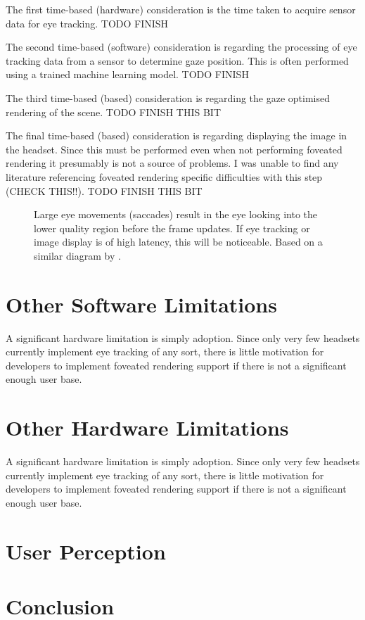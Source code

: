 \documentclass[a4paper,11pt]{article}
\begin{document}
The first time-based (hardware) consideration is the time taken to acquire sensor data for eye tracking. TODO FINISH

The second time-based (software) consideration is regarding the processing of eye tracking data from a sensor to determine gaze position. This is often performed using a trained machine learning model. TODO FINISH

The third time-based (based) consideration is regarding the gaze optimised rendering of the scene. TODO FINISH THIS BIT

The final time-based (based) consideration is regarding displaying the image in the headset. Since this must be performed even when not performing foveated rendering it presumably is not a source of problems. I was unable to find any literature referencing foveated rendering specific difficulties with this step (CHECK THIS!!). TODO FINISH THIS BIT

\begin{figure}
  \begin{center}
    
    \caption{Large eye movements (saccades) result in the eye looking into the lower quality region before the frame updates. If eye tracking or image display is of high latency, this will be noticeable. Based on a similar diagram by \textcite{albert2017latency}.}
    \label{fig:eye}
  \end{center}
\end{figure}

\section{Other Software Limitations}
A significant hardware limitation is simply adoption. Since only very few headsets currently implement eye tracking of any sort, there is little motivation for developers to implement foveated rendering support if there is not a significant enough user base.

\section{Other Hardware Limitations}
A significant hardware limitation is simply adoption. Since only very few headsets currently implement eye tracking of any sort, there is little motivation for developers to implement foveated rendering support if there is not a significant enough user base.

\section{User Perception}

\section{Conclusion}

\printbibliography
\end{document}
